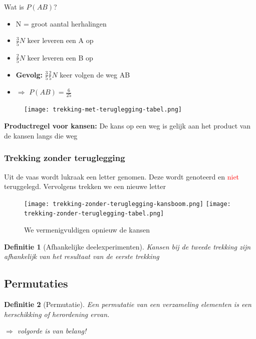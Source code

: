 \documentclass{article}
\newtheorem{theorem}{Definitie}[section]
\begin{document}
Wat is $P(AB)$?

\begin{itemize}
    \item N = groot aantal herhalingen
    \item $\frac{3}{5}N$ keer leveren een A op
    \item $\frac{2}{5}N$ keer leveren een B op
    \item \textbf{Gevolg:} $\frac35 \frac25 N$ keer volgen de weg AB
    \item $\Rightarrow$ $P(AB) = \frac{6}{25}$
\end{itemize}

\begin{figure}[H]
    \centering
    \texttt{[image: trekking-met-teruglegging-tabel.png]}
\end{figure}


\textbf{Productregel voor kansen:} De kans op een weg is gelijk aan het product van de kansen langs die weg
    

\subsubsection{Trekking zonder teruglegging}

Uit de vaas wordt lukraak een letter genomen. Deze wordt genoteerd en \textcolor{red}{niet} teruggelegd.
Vervolgens trekken we een nieuwe letter

\begin{figure}[H]
    \centering
    \texttt{[image: trekking-zonder-teruglegging-kansboom.png]}
    \texttt{[image: trekking-zonder-teruglegging-tabel.png]}
    \caption{We vermenigvuldigen opnieuw de kansen}
\end{figure}


\begin{theorem}[Afhankelijke deelexperimenten]
    Kansen bij de tweede trekking zijn afhankelijk van het resultaat van de eerste trekking
\end{theorem}

\subsection{Permutaties}

\begin{theorem}[Permutatie]
    Een permutatie van een verzameling elementen is een herschikking of herordening ervan.

    $\Rightarrow$ volgorde is van belang! 
\end{theorem}
\end{document}
